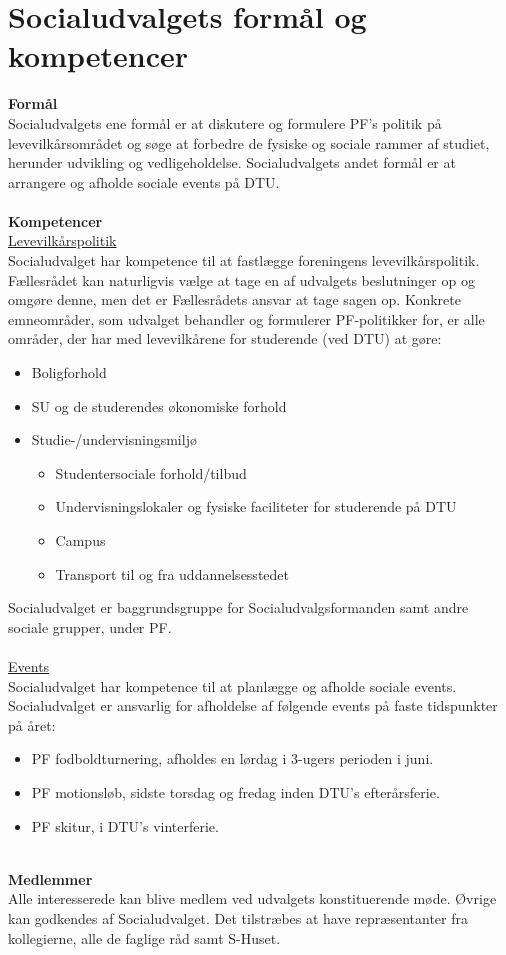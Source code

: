 \section{Socialudvalgets formål og kompetencer}
\textbf{Formål}\\
Socialudvalgets ene formål er at diskutere og formulere PF’s politik på levevilkårsområdet og søge at forbedre de
fysiske og sociale rammer af studiet, herunder udvikling og
vedligeholdelse.
Socialudvalgets andet formål er at arrangere og afholde sociale events på DTU.\\
\\
\textbf{Kompetencer}\\
\underline{Levevilkårspolitik}\\
Socialudvalget har kompetence til at fastlægge foreningens levevilkårspolitik.
Fællesrådet kan naturligvis vælge at tage en af udvalgets beslutninger op og omgøre
denne, men det er Fællesrådets ansvar at tage sagen op.
Konkrete emneområder, som udvalget behandler og formulerer PF-politikker for, er alle
områder, der har med levevilkårene for studerende (ved DTU) at gøre:
\begin{itemize}
\item Boligforhold
\item SU og de studerendes økonomiske forhold
\item Studie-/undervisningsmiljø
	\begin{itemize}
	\item Studentersociale forhold/tilbud
	\item Undervisningslokaler og fysiske faciliteter for studerende på DTU
	\item Campus
	\item Transport til og fra uddannelsesstedet
	\end{itemize}
\end{itemize}

Socialudvalget er baggrundsgruppe for Socialudvalgsformanden samt andre sociale
grupper, under PF.\\
\\
\underline{Events}\\
Socialudvalget har kompetence til at planlægge og afholde sociale events.
Socialudvalget er ansvarlig for afholdelse af følgende events på faste tidspunkter på året:
\begin{itemize}
\item PF fodboldturnering, afholdes en lørdag i 3-ugers perioden i juni.
\item PF motionsløb, sidste torsdag og fredag inden DTU's efterårsferie.
\item PF skitur, i DTU's vinterferie.
\end{itemize}
\textcolor{white}{linjeskift :)}\\
\textbf{Medlemmer}\\
Alle interesserede kan blive medlem ved udvalgets konstituerende møde. Øvrige kan godkendes af Socialudvalget. Det
tilstræbes at have repræsentanter fra kollegierne, alle de faglige råd samt S-Huset.

